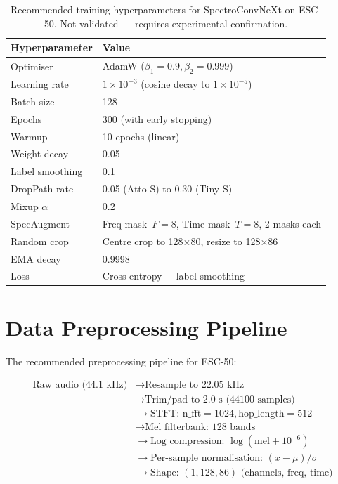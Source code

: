 \documentclass{article}
\begin{document}
\begin{table}[h]
  \centering
  \caption{Recommended training hyperparameters for SpectroConvNeXt on ESC-50.
  Not validated --- requires experimental confirmation.}
  \label{tab:training}
  \small
  \begin{tabular}{ll}
  \toprule
  \textbf{Hyperparameter} & \textbf{Value} \\
  \midrule
  Optimiser & AdamW ($\beta_1=0.9, \beta_2=0.999$) \\
  Learning rate & $1\times10^{-3}$ (cosine decay to $1\times10^{-5}$) \\
  Batch size & 128 \\
  Epochs & 300 (with early stopping) \\
  Warmup & 10 epochs (linear) \\
  Weight decay & 0.05 \\
  Label smoothing & 0.1 \\
  DropPath rate & 0.05 (Atto-S) to 0.30 (Tiny-S) \\
  Mixup $\alpha$ & 0.2 \\
  SpecAugment & Freq mask~$F=8$, Time mask~$T=8$, 2 masks each \\
  Random crop & Centre crop to 128$\times$80, resize to 128$\times$86 \\
  EMA decay & 0.9998 \\
  Loss & Cross-entropy + label smoothing \\
  \bottomrule
  \end{tabular}
\end{table}

\section{Data Preprocessing Pipeline}

The recommended preprocessing pipeline for ESC-50:

\begin{align*}
\text{Raw audio (44.1 kHz)} &\rightarrow \text{Resample to 22.05 kHz} \\
&\rightarrow \text{Trim/pad to 2.0 s (44100 samples)} \\
&\rightarrow \text{STFT: n\_fft}=1024, \text{hop\_length}=512 \\
&\rightarrow \text{Mel filterbank: 128 bands} \\
&\rightarrow \text{Log compression: } \log(\text{mel} + 10^{-6}) \\
&\rightarrow \text{Per-sample normalisation: } (x - \mu) / \sigma \\
&\rightarrow \text{Shape: } (1, 128, 86) \text{ (channels, freq, time)}
\end{align*}
\end{document}
